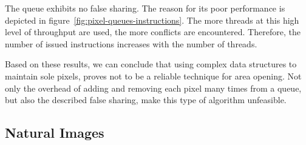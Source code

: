 The \citet{Anderson1994Waitfree} queue exhibits no false sharing. The reason for
its poor performance is depicted in
figure~\ref{fig:pixel-queues-instructions}. The more threads at this high level
of throughput are used, the more conflicts are encountered. Therefore, the
number of issued instructions increases with the number of threads.

Based on these results, we can conclude that using complex data structures to
maintain sole pixels, proves not to be a reliable technique for area
opening. Not only the overhead of adding and removing each pixel many times from
a queue, but also the described false sharing, make this type of algorithm
unfeasible.

\subsection{Natural Images}
\label{sec:experiments-ao-nat}

\newcommand{\rbc}{\emph{rbc}}
\newcommand{\facade}{\emph{facade}}
\newcommand{\mammo}{\emph{mammo}}

